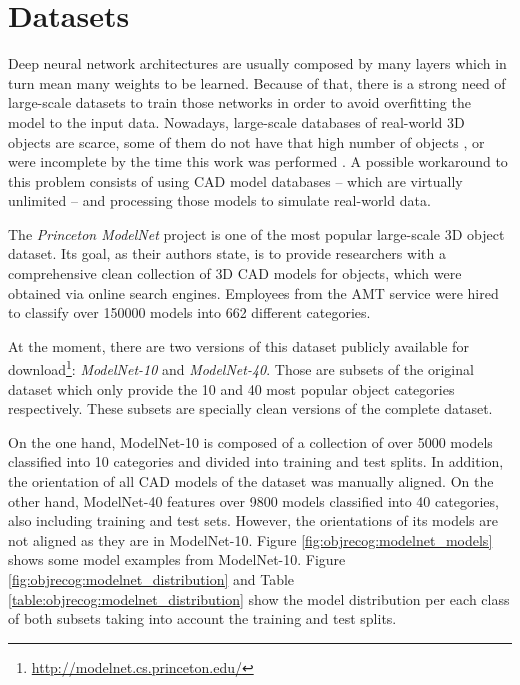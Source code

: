 \section{Datasets}
\label{cha:objrecog:sec:datasets}

Deep neural network architectures are usually composed by many layers which in turn mean many weights to be learned. Because of that, there is a strong need of large-scale datasets to train those networks in order to avoid overfitting the model to the input data. Nowadays, large-scale databases of real-world \acs{3D} objects are scarce, some of them do not have that high number of objects \cite{Lai2011}\cite{Singh2014}\cite{Li2014}, or were incomplete by the time this work was performed \cite{Choi2016}. A possible workaround to this problem consists of using \ac{CAD} model databases -- which are virtually unlimited -- and processing those models to simulate real-world data.

The \emph{Princeton ModelNet} project is one of the most popular large-scale \acs{3D} object dataset. Its goal, as their authors state, is to provide researchers with a comprehensive clean collection of \acs{3D} \ac{CAD} models for objects, which were obtained via online search engines. Employees from the \ac{AMT} service were hired to classify over \num{150000} models into \num{662} different categories.

At the moment, there are two versions of this dataset publicly available for download\footnote{\url{http://modelnet.cs.princeton.edu/}}: \emph{ModelNet-10} and \emph{ModelNet-40}. Those are subsets of the original dataset which only provide the \num{10} and \num{40} most popular object categories respectively. These subsets are specially clean versions of the complete dataset.

On the one hand, ModelNet-10 is composed of a collection of over 5000 models classified into 10 categories and divided into training and test splits. In addition, the orientation of all \ac{CAD} models of the dataset was manually aligned. On the other hand, ModelNet-40 features over \num{9800} models classified into \num{40} categories, also including training and test sets. However, the orientations of its models are not aligned as they are in ModelNet-10. Figure \ref{fig:objrecog:modelnet_models} shows some model examples from ModelNet-10. Figure \ref{fig:objrecog:modelnet_distribution} and Table \ref{table:objrecog:modelnet_distribution} show the model distribution per each class of both subsets taking into account the training and test splits. 

